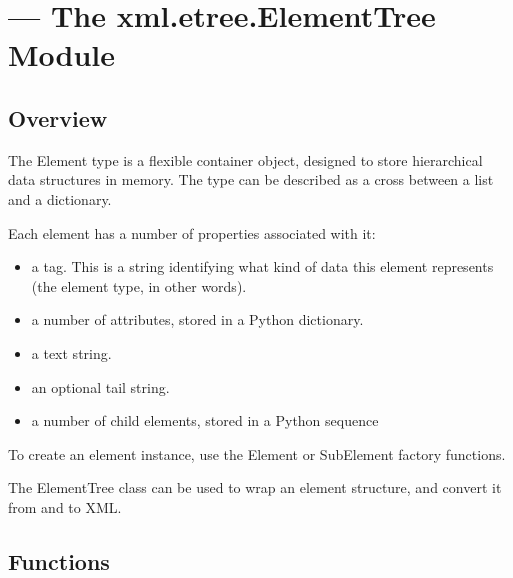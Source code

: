 \ifx\locallinewidth\undefined\newlength{\locallinewidth}\fi
\setlength{\locallinewidth}{\linewidth}
\section{ --- The xml.etree.ElementTree Module}


\subsection{Overview\label{elementtree-overview}}

The Element type is a flexible container object, designed to store
hierarchical data structures in memory. The type can be described as a
cross between a list and a dictionary.

Each element has a number of properties associated with it:
\begin{itemize}
\item {} 
a tag. This is a string identifying what kind of data
this element represents (the element type, in other words).

\item {} 
a number of attributes, stored in a Python dictionary.

\item {} 
a text string.

\item {} 
an optional tail string.

\item {} 
a number of child elements, stored in a Python sequence

\end{itemize}

To create an element instance, use the Element or SubElement factory
functions.

The ElementTree class can be used to wrap an element
structure, and convert it from and to XML.


\subsection{Functions\label{elementtree-functions}}


